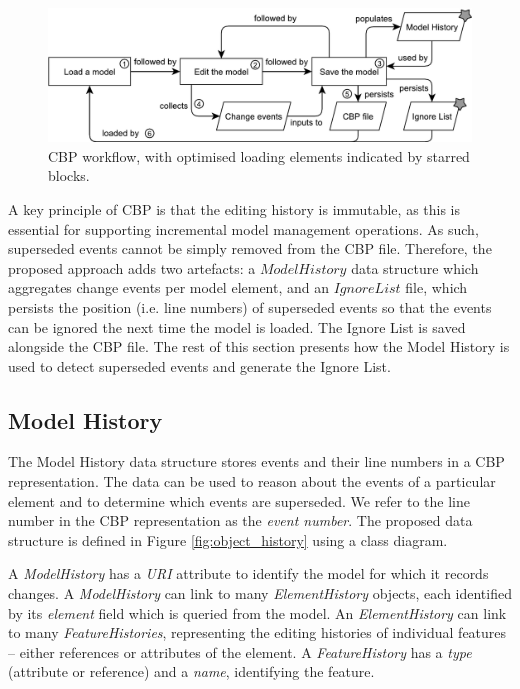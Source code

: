 \documentclass{llncs}
\begin{document}
    \vspace{-10pt}
    \begin{figure}[ht]
        \centering
        \includegraphics[width=\linewidth]{flowchart}
        \caption{CBP workflow, with optimised loading elements indicated by starred blocks.}
        \label{fig:flowchart}
    \end{figure}

    \vspace{-10pt}
    A key principle of CBP is that the editing history is immutable, as this is essential for supporting incremental model management operations. As such, superseded events cannot be simply removed from the CBP file. Therefore, the proposed approach adds two artefacts: a $Model History$ data structure which aggregates change events per model element, and an $Ignore List$ file, which persists the position (i.e. line numbers) of superseded events so that the events can be ignored the next time the model is loaded. The Ignore List is saved alongside the CBP file. The rest of this section presents how the Model History is used to detect superseded events and generate the Ignore List.
    
    \vspace{-10pt}
    \subsection{Model History}
    \label{subsec:model_history}
    The Model History data structure stores events and their line numbers in a CBP representation.  The data can be used to reason about the events of a particular element and to determine which events are superseded.  We refer to the line number in the CBP representation as the \emph{event number}. The proposed data structure is defined in Figure \ref{fig:object_history} using a class diagram.  
     
    A \emph{ModelHistory} has a \emph{URI} attribute to identify the model for which it records changes.  A \emph{ModelHistory} can link to many \emph{ElementHistory} objects, each identified by its \emph{element} field which is queried from the model. An \emph{ElementHistory} can link to many \emph{FeatureHistories}, representing the editing histories of individual features -- either references or attributes of the element. A \emph{FeatureHistory} has a \emph{type} (attribute or reference) and a \emph{name}, identifying the feature.
\end{document}
